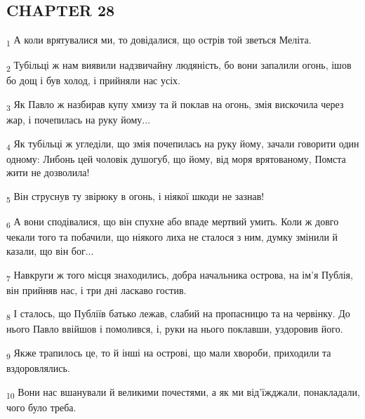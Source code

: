 \subsection{CHAPTER 28}
\begin{tcolorbox}
\textsubscript{1} А коли врятувалися ми, то довідалися, що острів той зветься Меліта.
\end{tcolorbox}
\begin{tcolorbox}
\textsubscript{2} Тубільці ж нам виявили надзвичайну людяність, бо вони запалили огонь, ішов бо дощ і був холод, і прийняли нас усіх.
\end{tcolorbox}
\begin{tcolorbox}
\textsubscript{3} Як Павло ж назбирав купу хмизу та й поклав на огонь, змія вискочила через жар, і почепилась на руку йому...
\end{tcolorbox}
\begin{tcolorbox}
\textsubscript{4} Як тубільці ж угледіли, що змія почепилась на руку йому, зачали говорити один одному: Либонь цей чоловік душогуб, що йому, від моря врятованому, Помста жити не дозволила!
\end{tcolorbox}
\begin{tcolorbox}
\textsubscript{5} Він струснув ту звірюку в огонь, і ніякої шкоди не зазнав!
\end{tcolorbox}
\begin{tcolorbox}
\textsubscript{6} А вони сподівалися, що він спухне або впаде мертвий умить. Коли ж довго чекали того та побачили, що ніякого лиха не сталося з ним, думку змінили й казали, що він бог...
\end{tcolorbox}
\begin{tcolorbox}
\textsubscript{7} Навкруги ж того місця знаходились, добра начальника острова, на ім'я Публія, він прийняв нас, і три дні ласкаво гостив.
\end{tcolorbox}
\begin{tcolorbox}
\textsubscript{8} І сталось, що Публіїв батько лежав, слабий на пропасницю та на червінку. До нього Павло ввійшов і помолився, і, руки на нього поклавши, уздоровив його.
\end{tcolorbox}
\begin{tcolorbox}
\textsubscript{9} Якже трапилось це, то й інші на острові, що мали хвороби, приходили та вздоровлялись.
\end{tcolorbox}
\begin{tcolorbox}
\textsubscript{10} Вони нас вшанували й великими почестями, а як ми від'їжджали, понакладали, чого було треба.
\end{tcolorbox}
